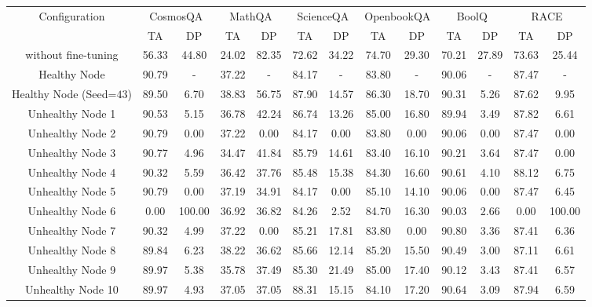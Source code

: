\begin{table*}[t]

\begin{center}
\begin{tiny}
\begin{sc}

\begin{tabular}{ccccccccccccc}
\toprule
\multirow{2}{*}{Configuration} & \multicolumn{2}{c}{CosmosQA} & \multicolumn{2}{c}{MathQA} & \multicolumn{2}{c}{ScienceQA} & \multicolumn{2}{c}{OpenbookQA} & \multicolumn{2}{c}{BoolQ} & \multicolumn{2}{c}{RACE} \\
 & TA & DP & TA & DP & TA & DP & TA & DP & TA & DP & TA & DP\\
\midrule
without fine-tuning & 56.33 & 44.80 & 24.02 & 82.35 & 72.62 & 34.22 & 74.70 & 29.30 & 70.21 & 27.89 & 73.63 & 25.44 \\
\midrule
Healthy Node & 90.79 & - & 37.22 & - & 84.17 & - & 83.80 & - & 90.06 & - & 87.47 & - \\
Healthy Node (Seed=$43$) & 89.50 & 6.70 & 38.83 & 56.75 & 87.90 & 14.57 & 86.30 & 18.70 & 90.31 & 5.26 & 87.62 & 9.95 \\
\midrule
Unhealthy Node 1 & 90.53 & 5.15 & 36.78 & 42.24 & 86.74 & 13.26 & 85.00 & 16.80 & 89.94 & 3.49 & 87.82 & 6.61  \\
Unhealthy Node 2 & 90.79 & 0.00 & 37.22 & 0.00 & 84.17 & 0.00 & 83.80 & 0.00 & 90.06 & 0.00 & 87.47 & 0.00 \\
Unhealthy Node 3 & 90.77 & 4.96 & 34.47 & 41.84 & 85.79 & 14.61 & 83.40 & 16.10 & 90.21 & 3.64 & 87.47 & 0.00 \\
Unhealthy Node 4 & 90.32 & 5.59 & 36.42 & 37.76 & 85.48 & 15.38 & 84.30 & 16.60 & 90.61 & 4.10 & 88.12 & 6.75  \\
Unhealthy Node 5 & 90.79 & 0.00 & 37.19 & 34.91 & 84.17 & 0.00 & 85.10 & 14.10 & 90.06 & 0.00 & 87.47 & 6.45 \\
Unhealthy Node 6 & 0.00 & 100.00 & 36.92 & 36.82 & 84.26 & 2.52 & 84.70 & 16.30 & 90.03 & 2.66 & 0.00 & 100.00 \\
Unhealthy Node 7 & 90.32 & 4.99 & 37.22 & 0.00 & 85.21 & 17.81 & 83.80 & 0.00 & 90.80 & 3.36 & 87.41 & 6.36  \\
Unhealthy Node 8 & 89.84 & 6.23 & 38.22 & 36.62 & 85.66 & 12.14 & 85.20 & 15.50 & 90.49 & 3.00 & 87.11 & 6.61 \\
Unhealthy Node 9 & 89.97 & 5.38 & 35.78 & 37.49 & 85.30 & 21.49 & 85.00 & 17.40 & 90.12 & 3.43  & 87.41 & 6.57 \\
Unhealthy Node 10 & 89.97 & 4.93 & 37.05 & 37.05 & 88.31 & 15.15 & 84.10 & 17.20 & 90.64 & 3.09  & 87.94 & 6.59 \\

\end{tabular}
\end{sc}
\end{tiny}
\end{center}
\end{table*}
